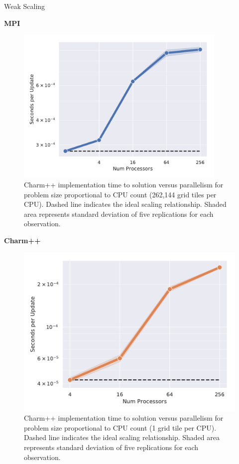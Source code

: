 \begin{block}{Weak Scaling}
  \vspace{-0.5ex}
\begin{alertblock}{\textbf{MPI}}
\begin{figure}
    \centering
    \includegraphics[width=0.9\textwidth]{img/MPIWeak}
  	\caption{
    Charm++ implementation time to solution versus parallelism for problem size proportional to CPU count (262,144 grid tiles per CPU).
    Dashed line indicates the ideal scaling relationship.
    Shaded area represents standard deviation of five replications for each observation.
    }
\end{figure}
\end{alertblock}
\vspace{-0.5ex}
\begin{alertblock}{\textbf{Charm++}}
\begin{figure}
    \centering
    \includegraphics[width=\textwidth]{img/CharmWeak}
  	\caption{
    Charm++ implementation time to solution versus parallelism for problem size proportional to CPU count (1 grid tile per CPU).
    Dashed line indicates the ideal scaling relationship.
    Shaded area represents standard deviation of five replications for each observation.
    }
\end{figure}
\end{alertblock}

\end{block}
